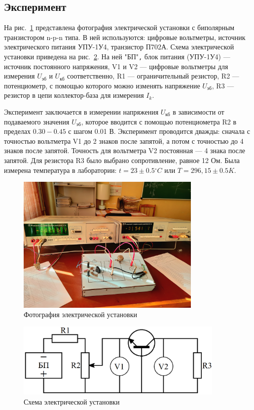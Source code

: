 \subsection{Эксперимент}
На рис.~\ref{fig:photo} представлена фотография электрической установки с биполярным транзистором n-p-n типа. В ней используются: цифровые вольтметры, источник электрического питания УПУ-1У4, транзистор П702А. Схема электрической установки приведена на рис.~\ref{fig:scheme}. На ней "БП"\verb|,| блок питания (УПУ-1У4) — источник постоянного напряжения, V1 и V2 — цифровые вольтметры для измерения $U_{\text{эб}}$ и $U_{\text{кб}}$ соответственно, R1 — ограничительный резистор, R2 — потенциометр, с помощью которого можно изменять напряжение $U_{\text{эб}}$, R3 — резистор в цепи коллектор-база для измерения $I_k$.

Эксперимент заключается в измерении напряжения $U_{\text{кб}}$ в зависимости от подаваемого значения $U_{\text{эб}}$, которое вводится с помощью потенциометра R2 в пределах $0.30{-}0.45$ с шагом 0.01 В. Эксперимент проводится дважды: сначала с точностью вольтметра V1 до 2 знаков после запятой, а потом с точностью до 4 знаков после запятой. Точность для вольтметра V2 постоянная — 4 знака после запятой. Для резистора R3 было выбрано сопротивление, равное 12 Ом. Была измерена температура  в лаборатории: $t = {23 \pm 0.5}{^\circ}C$ или $T = {296,15 \pm 0.5}K$.

\begin{figure}[H]
\centering
\includegraphics[width=0.8\textwidth]{photo.jpg}
\caption{Фотография электрической установки}
\label{fig:photo}
\end{figure}

\begin{figure}[H]
\centering
\includegraphics[width=0.9\textwidth]{scheme.png}
\caption{Схема электрической установки}
\label{fig:scheme}
\end{figure}

